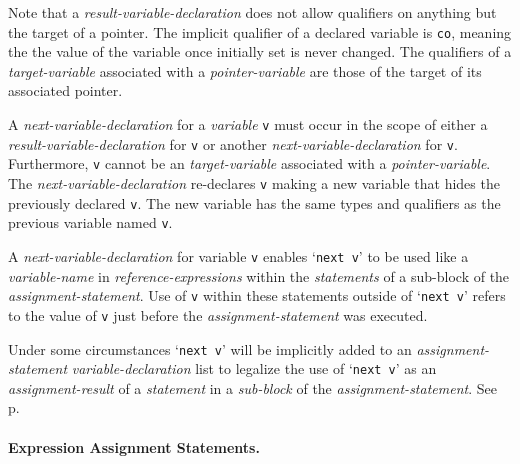 \documentclass[12pt]{article}
\newcommand{\subsubsubsection}[1]{\paragraph[#1]{#1.}}
\newcommand{\pagref}[1]{p\pageref{#1}}
\begin{document}
Note that a {\em result-variable-declaration} does not allow
qualifiers on anything but the target of a pointer.  The implicit
qualifier of a declared variable is {\tt co}, meaning the
the value of the variable once initially set is never changed.
The qualifiers of a {\em target-variable} associated with a
{\em pointer-variable} are those of the target of
its associated pointer.

A {\em next-variable-declaration} for a {\em variable} {\tt v}
must occur in the scope of either a {\em result-variable-declaration}
for {\tt v} or another {\em next-variable-declaration} for {\tt v}.
Furthermore, {\tt v} cannot be an {\em target-variable} associated
with a {\em pointer-variable}.
The {\em next-variable-declaration} re-declares {\tt v} making a new
variable that hides the previously declared {\tt v}.  The new variable
has the same types and qualifiers as the previous variable named {\tt v}.

A {\em next-variable-declaration} for variable {\tt v} enables
`{\tt next v}' to be used like a {\em variable-name}
in {\em reference-expressions} within the {\em statements}
of a sub-block of the {\em assignment-statement}.  Use of
{\tt v} within these statements outside of `{\tt next v}'
refers to the value of {\tt v} just
before the {\em assignment-statement} was executed.

Under some circumstances `{\tt next v}' will
be implicitly added to an {\em assignment-statement}
{\em variable-declaration} list to legalize the
use of `{\tt next v}' as an {\em assignment-result} of a {\em statement}
in a {\em sub-block} of the {\em assignment-statement}.
See \pagref{NEXT-PROMOTION}.

\subsubsubsection{Expression Assignment Statements}
\label{EXPRESSION-ASSIGNMENT-STATEMENTS}
\end{document}
